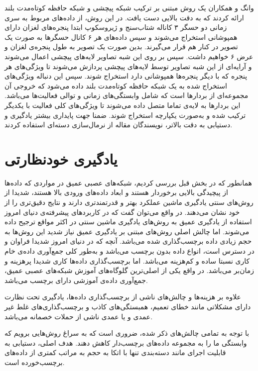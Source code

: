 وانگ و همکاران\cite{wang2020wearable} یک روش مبتنی بر ترکیب شبکه پیچشی و شبکه حافظه کوتاه‌مدت بلند ارائه کردند که به دقت بالایی دست یافت. در این روش، از داده‌های مربوط به سری زمانی دو حسگر ۳ کاناله شتاب‌سنج و ژیروسکوپ ابتدا
پنجره‌های لغزان
دارای همپوشانی استخراج می‌شوند و سپس داده‌های هر ۶ کانال حسگرها به صورت یک تصویر در کنار هم قرار می‌گیرند. بدین صورت یک تصویر به طول پنجره‌ی لغزان و عرض ۶ خواهیم داشت. سپس بر روی این شبه تصاویر لایه‌های پیچشی اعمال می‌شوند و آرایه‌ای از این شبه تصاویر توسط لایه‌های پیچشی پردازش می‌شوند تا ویژگی‌های هر پنجره که با دیگر پنجره‌ها همپوشانی دارد استخراج شوند. سپس این دنباله ویژگی‌های استخراج شده به یک شبکه حافظه کوتاه‌مدت بلند داده می‌شود که خروجی آن مجموعه‌ای از بردارها است که شامل وابستگی‌های زمانی و توالی فعالیت‌ها می‌باشد. این بردارها به لایه‌ی تماما متصل داده می‌شوند تا ویژگی‌های کلی فعالیت با یکدیگر
ترکیب
شده و به‌صورت یکپارچه استخراج شوند. ضمنا جهت پایداری بیشتر یادگیری و دستیابی به دقت بالاتر، نویسندگان مقاله از
نرمال‌سازی دسته‌ای
استفاده کردند.

\section{یادگیری خودنظارتی}

همانطور که در بخش قبل بررسی کردیم، شبکه‌های عصبی عمیق در مواردی که داده‌ها از پیچیدگی بالایی برخوردار هستند و ابعاد داده‌های ورودی بالا هستند، شدیدا از روش‌های سنتی یادگیری ماشین عملکرد بهتر و قدرتمندتری دارند و نتایج دقیق‌تری را از خود نشان می‌دهند. در واقع می‌توان گفت که در کاربردهای پیشرفته‌ی دنیای امروز استفاده از یادگیری عمیق به روش‌های یادگیری ماشین سنتی در اکثر مواقع ترجیح داده می‌شوند. اما چالش اصلی روش‌های مبتنی بر یادگیری عمیق نیاز شدید این روش‌ها به حجم زیادی داده برچسب‌گذاری شده می‌باشد. آنچه که در دنیای امروز شدیدا فراوان و در دسترس است، انواع داده بدون برچسب می‌باشد و به‌طور کلی جمع‌آوری داده‌ی خام کاری نسبتا ساده و کم‌هزینه می‌باشد. اما برچسب‌گذاری داده‌ها کاری شدیدا پرهزینه و زمان‌بر می‌باشد. در واقع یکی از اصلی‌ترین
گلوگاه‌های
آموزش شبکه‌های عصبی عمیق، جمع‌آوری داده‌ی آموزشی دارای برچسب می‌باشد.

علاوه بر هزینه‌ها و چالش‌های ناشی از برچسب‌گذاری داده‌ها، یادگیری تحت نظارت دارای مشکلاتی مانند 
خطای تعمیم،
همبستگی‌های کاذب
و برچسب‌گذاری‌های غلط غیر عمدی و یا عمدی ناشی از حملات خصمانه
می‌باشد\cite{liu2021self}.

با توجه به تمامی چالش‌های ذکر شده، ضروری است که به سراغ روش‌هایی برویم که وابستگی ما را به مجموعه داده‌های برچسب‌دار کاهش دهند. هدف اصلی، دستیابی به قابلیت اجرای مانند دسته‌بندی تنها با اتکا به حجم به مراتب کمتری از داده‌های برچسب‌خورده است.

